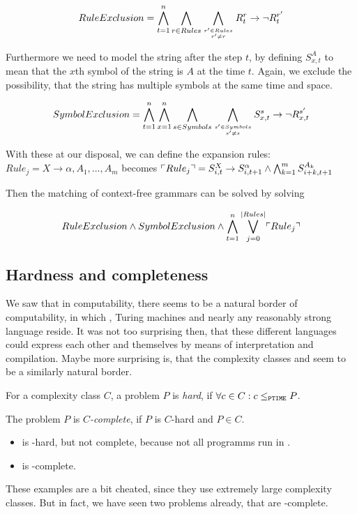 \[ RuleExclusion = \bigwedge_{t=1}^{n}\bigwedge_{r\in Rules} \bigwedge_{r'\in Rules\atop r'\neq r} R_t^r \rightarrow \lnot R_t^{r'}\]

Furthermore we need to model the string after the step $t$, by defining 
$S^A_{x,t}$ to mean that the $x$th symbol of the string is $A$ at the time $t$. 
Again, we exclude the possibility, that the string has multiple symbols at 
the same time and space.

\[ SymbolExclusion = \bigwedge_{t=1}^{n}\bigwedge_{x=1}^{n}\bigwedge_{s\in Symbols} \bigwedge_{s'\in Symbols\atop s'\neq s} S_{x,t}^s \rightarrow \lnot R_{x,t}^{s'}\]

With these at our disposal, we can define the expansion rules: 
$Rule_j = X \rightarrow \alpha, A_1, \ldots, A_m$ becomes 
$\ulcorner Rule_j \urcorner = S^X_{i,t}\rightarrow S^\alpha_{i,t+1}\wedge \bigwedge_{k=1}^m S^{A_k}_{i+k, t+1}$

Then the matching of context-free grammars can be solved by solving

\[ RuleExclusion \wedge SymbolExclusion \wedge \bigwedge_{t=1}^{n}\bigvee_{j = 0}^{\left|Rules\right|} \ulcorner Rule_j \urcorner \]

\subsection{Hardness and completeness}
We saw that in computability, there seems to be a natural border of 
computability, in which \WHILE, Turing machines and nearly any reasonably 
strong language reside. It was not too surprising then, that these different 
languages could express each other and themselves by means of interpretation and
compilation. Maybe more surprising is, that the complexity classes \PTIME and 
\NPTIME seem to be a similarly natural border.

\begin{defn}
	For a complexity class $C$, a problem $P$ is \emph{hard}, if 
	$\forall c\in C: c \leq_{\mathtt{PTIME}} P$.

	The problem $P$ is \emph{$C$-complete}, if $P$ is $C$-hard and $P\in C$.
\end{defn}
\begin{example}
	\begin{itemize}
		\item \FOR is \PTIME-hard, but not complete, because not all \FOR programms run in \PTIME.
		\item \TM is \WHILE-complete.
	\end{itemize}
\end{example}
These examples are a bit cheated, since they use extremely large complexity 
classes. But in fact, we have seen two problems already, that are \NPTIME-complete.

